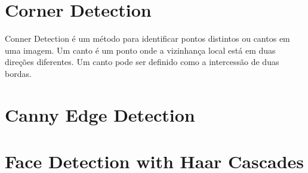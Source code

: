 \documentclass[article,
12pt,
a4paper,
openany,
oneside,
brazil,
]{abntex2}
\begin{document}
  \section{Corner Detection}
    Conner Detection é um método para identificar pontos distintos ou cantos em uma imagem. Um canto é um ponto onde a vizinhança local está em duas direções diferentes. Um canto pode ser definido como a intercessão de duas bordas.

  \section{Canny Edge Detection}
  \section{Face Detection with Haar Cascades}
  \newpage
  
\end{document}
